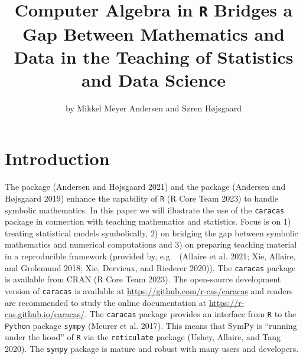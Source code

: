 \title{Computer Algebra in \texttt{R} Bridges a Gap Between Mathematics and Data in the Teaching of Statistics and Data Science}
\author{by Mikkel Meyer Andersen and Søren Højsgaard}

\maketitle


\hypertarget{introduction}{%
\section{Introduction}\label{introduction}}

The  package (Andersen and Højsgaard 2021) and the 
package (Andersen and Højsgaard 2019) enhance the capability of \texttt{R} (R Core Team 2023) to handle
symbolic mathematics. In this paper we will illustrate the use of the
\texttt{caracas} package in connection with teaching mathematics and
statistics. Focus is on 1) treating statistical models symbolically,
2) on bridging the gap between symbolic mathematics and numerical
computations and 3) on preparing teaching material in a reproducible
framework (provided by, e.g.~ (Allaire et al. 2021; Xie, Allaire, and Grolemund 2018; Xie, Dervieux, and Riederer 2020)). The \texttt{caracas} package
is available from CRAN (R Core Team 2023). The open-source development version of
\texttt{caracas} is available at \url{https://github.com/r-cas/caracas} and
readers are recommended to study the online documentation at
\url{https://r-cas.github.io/caracas/}. The \texttt{caracas} package provides an
interface from \texttt{R} to the \texttt{Python} package \texttt{sympy} (Meurer et al. 2017). This
means that SymPy is ``running under the hood'' of \texttt{R} via the
\texttt{reticulate} package (Ushey, Allaire, and Tang 2020). The \texttt{sympy} package is mature and
robust with many users and developers.

